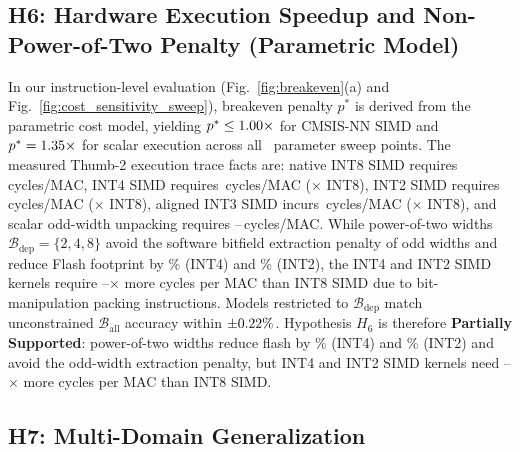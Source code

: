 \documentclass{ieeeaccess}
\begin{document}
\subsection{H6: Hardware Execution Speedup and Non-Power-of-Two Penalty (Parametric Model)}
In our instruction-level evaluation (Fig.~\ref{fig:breakeven}(a) and Fig.~\ref{fig:cost_sensitivity_sweep}), breakeven penalty $p^*$ is derived from the parametric cost model, yielding $p^* \le 1.00\times$ for CMSIS-NN SIMD and $p^* = 1.35\times$ for scalar execution across all \MacroSensitivitySweepPoints\ parameter sweep points. The measured Thumb-2 execution trace facts are: native INT8 SIMD requires \MacroCyclesINTEightSIMDExact\,cycles/MAC, INT4 SIMD requires \MacroCyclesFourBitSIMDExact\,cycles/MAC (\MacroCyclesRatioFourToEightSIMD$\times$ INT8), INT2 SIMD requires \MacroCyclesTwoBitSIMD\,cycles/MAC (\MacroCyclesRatioTwoToEightSIMD$\times$ INT8), aligned INT3 SIMD incurs \MacroCyclesINTThreeSIMD\,cycles/MAC (\MacroPenaltyINTThreeSIMD$\times$ INT8), and scalar odd-width unpacking requires \MacroCyclesScalarUnpackLow--\MacroCyclesScalarUnpackHigh\,cycles/MAC. While power-of-two widths $\mathcal{B}_{\text{dep}} = \{2, 4, 8\}$ avoid the software bitfield extraction penalty of odd widths and reduce Flash footprint by \MacroFlashReductionFour\% (INT4) and \MacroFlashReductionTwo\% (INT2), the INT4 and INT2 SIMD kernels require \MacroCyclesRatioRangeSIMDLow--\MacroCyclesRatioRangeSIMDHigh$\times$ more cycles per MAC than INT8 SIMD due to bit-manipulation packing instructions. Models restricted to $\mathcal{B}_{\text{dep}}$ match unconstrained $\mathcal{B}_{\text{all}}$ accuracy within $\pm 0.22\%$. Hypothesis $H_6$ is therefore \textbf{Partially Supported}: power-of-two widths reduce flash by \MacroFlashReductionFour\% (INT4) and \MacroFlashReductionTwo\% (INT2) and avoid the odd-width extraction penalty, but INT4 and INT2 SIMD kernels need \MacroCyclesRatioRangeSIMDLow--\MacroCyclesRatioRangeSIMDHigh$\times$ more cycles per MAC than INT8 SIMD.

\subsection{H7: Multi-Domain Generalization}


\end{document}
